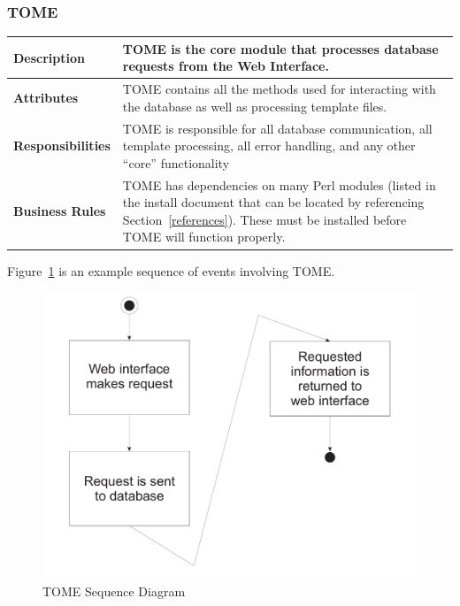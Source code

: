 \documentclass[12pt,titlepage]{article}
\begin{document}
\subsubsection{TOME}
\begin{longtable}{|p{}|p{}|}
	\hline
	\textbf{Description} & TOME is the core module that processes database requests from the Web Interface.\\
	\hline
	\textbf{Attributes} & TOME contains all the methods used for interacting with the database as well as processing template files.\\
	\hline
	\textbf{Responsibilities} & TOME is responsible for all database communication, all template processing, all error handling, and any other ``core'' functionality\\
	\hline
	\textbf{Business Rules} & TOME has dependencies on many Perl modules (listed in the install document that can be located by referencing Section~\ref{references}).  These must be installed before TOME will function properly.\\
	\hline
\end{longtable}
Figure~\ref{TOMESequenceDiagram} is an example sequence of events involving TOME.
\begin{figure}[h]
	\centering
	\includegraphics[width=.5\textwidth]{TOMESequenceDiagram}
	\caption{TOME Sequence Diagram}
	\label{TOMESequenceDiagram}
\end{figure}
\end{document}
